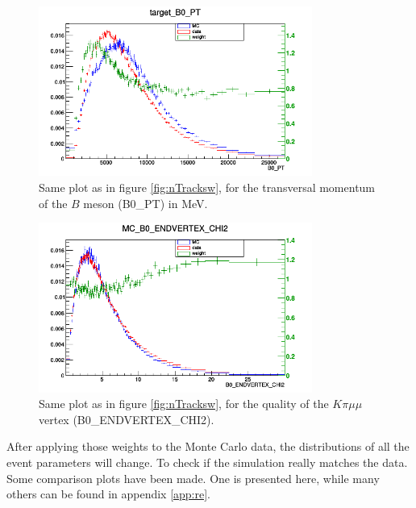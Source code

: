 \documentclass[english]{uzhpub}
\begin{document}
\begin{figure}[H]
\centering
\includegraphics[width=0.8\textwidth]{Reweighting/B0_PTw}
\caption{Same plot as in figure \ref{fig:nTracksw}, for the transversal momentum of the $B$ meson (B0\_PT) in MeV.}
\label{fig:B0_PTw}
\end{figure}

\begin{figure}[H]
\centering
\includegraphics[width=0.8\textwidth]{Reweighting/B0_ENDVERTEX_CHI2w}
\caption{Same plot as in figure \ref{fig:nTracksw}, for the quality of the $K \pi \mu \mu$ vertex (B0\_ENDVERTEX\_CHI2).}
\label{fig:B0_ENDVERTEX_CHI2w}
\end{figure}

After applying those weights to the Monte Carlo data, the distributions of all the event parameters will change. To check if the simulation really matches the data. Some comparison plots have been made. One is presented here, while many others can be found in appendix \ref{app:re}.
\end{document}
